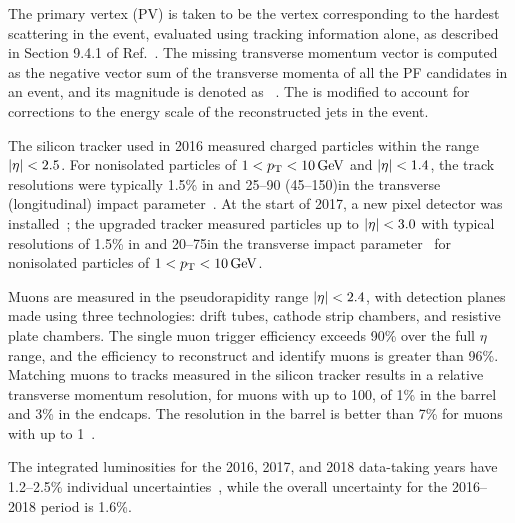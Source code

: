 The primary vertex (PV) is taken to be the vertex corresponding to the hardest scattering in the event, evaluated using tracking information alone, as described in Section 9.4.1 of Ref.~\cite{CMS-TDR-15-02}. The missing transverse momentum vector \ptvecmiss is computed as the negative vector sum of the transverse momenta of all the PF candidates in an event, and its magnitude is denoted as \ptmiss~\cite{CMS:2019ctu}. The \ptvecmiss is modified to account for corrections to the energy scale of the reconstructed jets in the event.

The silicon tracker used in 2016 measured charged particles within the range $\abs{\eta} < 2.5$. For nonisolated particles of $1 < p_{\mathrm{T}} < 10\,\text{Ge\hspace{-.08em}V}$ and $\abs{\eta} < 1.4$, the track resolutions were typically 1.5\% in \pt and 25--90 (45--150)\mum in the transverse (longitudinal) impact parameter~\cite{CMS:2014pgm}. At the start of 2017, a new pixel detector was installed~\cite{Phase1Pixel}; the upgraded tracker measured particles up to $\abs{\eta} < 3.0$ with typical resolutions of 1.5\% in \pt and 20--75\mum in the transverse impact parameter~\cite{DP-2020-049} for nonisolated particles of $1 < p_{\mathrm{T}} < 10\,\text{Ge\hspace{-.08em}V}$.

Muons are measured in the pseudorapidity range $\abs{\eta} < 2.4$, with detection planes made using three technologies: drift tubes, cathode strip chambers, and resistive plate chambers. The single muon trigger efficiency exceeds 90\% over the full $\eta$ range, and the efficiency to reconstruct and identify muons is greater than 96\%. Matching muons to tracks measured in the silicon tracker results in a relative transverse momentum resolution, for muons with \pt up to 100\GeV, of 1\% in the barrel and 3\% in the endcaps. The \pt resolution in the barrel is better than 7\% for muons with \pt up to 1\TeV~\cite{CMS:2018rym}.


The integrated luminosities for the 2016, 2017, and 2018 data-taking years have 1.2--2.5\% individual uncertainties~\cite{CMS-LUM-17-003,CMS-PAS-LUM-17-004,CMS-PAS-LUM-18-002}, while the overall uncertainty for the 2016--2018 period is 1.6\%.

